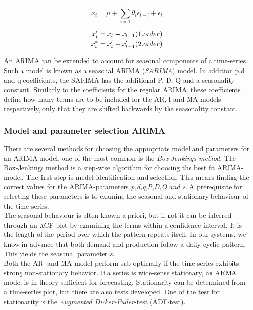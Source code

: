 \begin{equation}
    x_t = \mu + \sum_{i=1}^{q}{\theta_i \epsilon_{t-i}} + \epsilon_t
    \label{eq:ma_model}
\end{equation}

\begin{align}
    x_t' &= x_t - x_{t-1}        (1.order)\notag\\
    x_t^* &= x_t' - x_{t-1}'     (2.order)
    \label{eq:differencing}
\end{align}

An ARIMA can be extended to account for seasonal components of a time-series. Such a model is known as a seasonal ARIMA (\textit{SARIMA}) model. In addition p,d and q coefficients, the SARIMA has the additional P, D, Q and a seasonality constant. Similarly to the coefficients for the regular  ARIMA, these coefficients define how many terms are to be included for the AR, I and MA models respectively, only that they are shifted backwards by the seasonality constant. 

\subsubsection{Model and parameter selection ARIMA}\label{seq:tuning_arima}
There are several methods for choosing the appropriate model and parameters for an ARIMA model, one of the most common is the \textit{Box-Jenkings method}. The Box-Jenkings method is a step-wise algorithm for choosing the best fit ARIMA-model. The first step is model identification and selection. This means finding the correct values for the ARIMA-parameters \textit{p,d,q,P,D,Q and s}. A prerequisite for selecting these parameters is to examine the seasonal and stationary behaviour of the time-series.\\ 

The seasonal behaviour is often known a priori, but if not it can be inferred through an ACF plot by examining the terms within a confidence interval. It is the length of the period over which the pattern repeats itself. In our systems, we know in advance that both demand and production follow a daily cyclic pattern. This yields the seasonal parameter \textit{s}.\\

Both the AR- and MA-model perform sub-optimally if the time-series exhibits strong non-stationary behavior.  If a series is wide-sense stationary, an ARMA model is in theory sufficient for forecasting. Stationarity can be determined from a time-series plot, but there are also tests developed. One of the test for stationarity is the \textit{Augmented Dicker-Fuller}-test (ADF-test).\\ 


